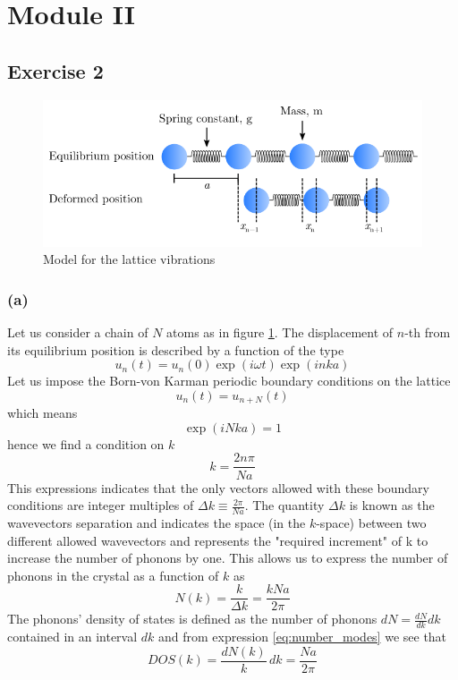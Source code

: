 \documentclass{article}
\begin{document}
\newpage

\section*{Module II}

\subsection*{Exercise 2}
\begin{figure}
    \centering
    \includegraphics[scale=0.5]{figures/lattice_model.png}
    \caption{Model for the lattice vibrations}
    \label{fig:lattice_model}
\end{figure}
\subsubsection*{(a)}
Let us consider a chain of $N$ atoms as in figure \ref{fig:lattice_model}. The displacement of $n$-th from its equilibrium position is described by a function of the type
\begin{equation*}
    u_n(t) = u_n(0) \exp(i\omega t) \exp(inka)
\end{equation*}
Let us impose the Born-von Karman periodic boundary conditions on the lattice
\begin{equation*}
    u_n(t) = u_{n+N}(t)
\end{equation*}
which means
\begin{equation*}
    \exp(iNka) = 1
\end{equation*}
hence we find a condition on $k$
\begin{equation*}
    k = \frac{2n\pi}{N a}
\end{equation*}
This expressions indicates that the only vectors allowed with these boundary conditions are integer multiples of $\Delta k \equiv \frac{2\pi}{Na}$. The quantity $\Delta k$ is known as the 
wavevectors separation and indicates the space (in the $k$-space) between two different allowed wavevectors and represents the "required increment" of k to increase the number of phonons by one. 
This allows us to express the number of phonons in the crystal as a function of $k$ as 
\begin{equation}
    N(k) = \frac{k}{\Delta k} = \frac{kNa}{2\pi}
    \label{eq:number_modes}
\end{equation}
The phonons' density of states is defined as the number of phonons $dN = \frac{dN}{dk} dk$ contained in an interval $dk$ and from expression \ref{eq:number_modes} we see that
\begin{equation*}
    DOS(k) = \frac{dN(k)}{k} \, dk = \frac{Na}{2\pi}
\end{equation*}
\end{document}
